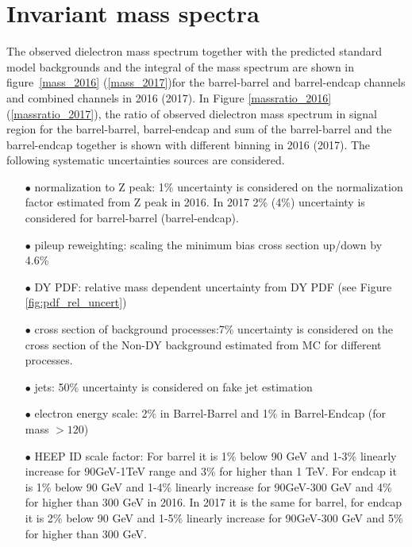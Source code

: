 \clearpage
\section{Invariant mass spectra}
\label{sec:results}

The observed dielectron mass spectrum together with the predicted standard model backgrounds and the integral of the mass spectrum are shown in figure~\ref{mass_2016} (\ref{mass_2017})for the barrel-barrel and barrel-endcap channels and combined channels in 2016 (2017).
In Figure \ref{massratio_2016} (\ref{massratio_2017}), the ratio of observed dielectron mass spectrum in signal region for the barrel-barrel, barrel-endcap and sum of the barrel-barrel and the barrel-endcap together is shown with different binning in 2016 (2017).
The following systematic uncertainties sources are considered.

\begin{itemize}
  \item[$\bullet$] normalization to Z peak: 1\% uncertainty is considered on the normalization factor estimated from Z peak in 2016. In 2017 2\% (4\%) uncertainty is considered for barrel-barrel (barrel-endcap).
  \item[$\bullet$] pileup reweighting: scaling the minimum bias cross section up/down by 4.6\%
  \item[$\bullet$] DY PDF: relative mass dependent uncertainty from DY PDF (see Figure \ref{fig:pdf_rel_uncert})
  \item[$\bullet$] cross section of background processes:7\% uncertainty is considered on the cross section of the Non-DY background estimated from MC for different processes.
  \item[$\bullet$] jets: 50\% uncertainty is considered on fake jet estimation
  \item[$\bullet$] electron energy scale: 2\% in Barrel-Barrel and 1\% in Barrel-Endcap (for mass $>120$)
  \item[$\bullet$] HEEP ID scale factor: For barrel it is 1\%  below 90 GeV and 1-3\% linearly increase for 90GeV-1TeV range and 3\% for higher than 1 TeV. For endcap it is 1\% below 90 GeV and 1-4\% linearly increase for 90GeV-300 GeV and 4\% for higher than 300 GeV in 2016. In 2017 it is the same for barrel, for endcap it is 2\% below 90 GeV and 1-5\% linearly increase for 90GeV-300 GeV and 5\% for higher than 300 GeV.
\end{itemize}


